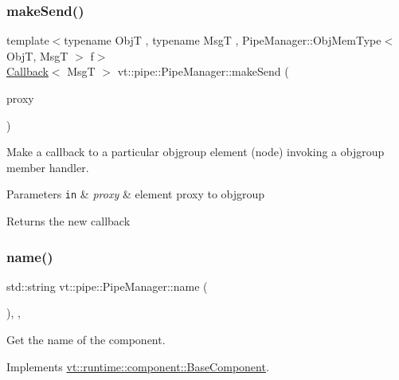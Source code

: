 \subsubsection{\texorpdfstring{make\+Send()}{makeSend()}\hspace{0.1cm}{\footnotesize\ttfamily [6/6]}}
{\footnotesize\ttfamily template$<$typename ObjT , typename MsgT , Pipe\+Manager\+::\+Obj\+Mem\+Type$<$ Obj\+T, Msg\+T $>$ f$>$ \\
\hyperlink{namespacevt_a36db99df4c973d48b1118a293fff533f}{Callback}$<$ MsgT $>$ vt\+::pipe\+::\+Pipe\+Manager\+::make\+Send (\begin{DoxyParamCaption}\item[{\hyperlink{structvt_1_1objgroup_1_1proxy_1_1_proxy_elm}{objgroup\+::proxy\+::\+Proxy\+Elm}$<$ ObjT $>$}]{proxy }\end{DoxyParamCaption})}



Make a callback to a particular objgroup element (node) invoking a objgroup member handler. 


\begin{DoxyParams}[1]{Parameters}
\mbox{\tt in}  & {\em proxy} & element proxy to objgroup\\
\hline
\end{DoxyParams}
\begin{DoxyReturn}{Returns}
the new callback 
\end{DoxyReturn}
\mbox{\label{structvt_1_1pipe_1_1_pipe_manager_aad60c922d604dd1b9ff47e428d265eed}} 
\subsubsection{\texorpdfstring{name()}{name()}}
{\footnotesize\ttfamily std\+::string vt\+::pipe\+::\+Pipe\+Manager\+::name (\begin{DoxyParamCaption}{ }\end{DoxyParamCaption})\hspace{0.3cm}{\ttfamily [inline]}, {\ttfamily [override]}, {\ttfamily [virtual]}}



Get the name of the component. 



Implements \hyperlink{structvt_1_1runtime_1_1component_1_1_base_component_a7701485f3539f78d42e6bad47fc7eb78}{vt\+::runtime\+::component\+::\+Base\+Component}.

